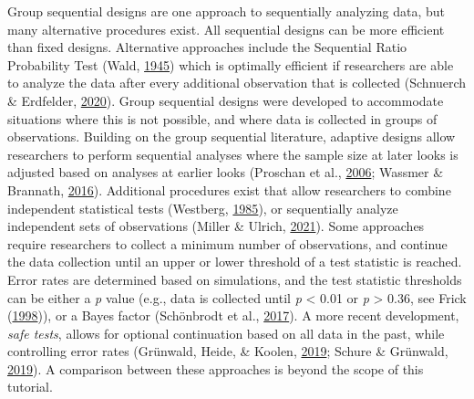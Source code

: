 \documentclass[
  english,
  ,jou, a4paper,floatsintext]{apa6}
\begin{document}
Group sequential designs are one approach to sequentially analyzing data, but many alternative procedures exist. All sequential designs can be more efficient than fixed designs. Alternative approaches include the Sequential Ratio Probability Test (Wald, \protect\hyperlink{ref-wald_sequential_1945}{1945}) which is optimally efficient if researchers are able to analyze the data after every additional observation that is collected (Schnuerch \& Erdfelder, \protect\hyperlink{ref-schnuerch_controlling_2020}{2020}). Group sequential designs were developed to accommodate situations where this is not possible, and where data is collected in groups of observations. Building on the group sequential literature, adaptive designs allow researchers to perform sequential analyses where the sample size at later looks is adjusted based on analyses at earlier looks (Proschan et al., \protect\hyperlink{ref-proschan_statistical_2006}{2006}; Wassmer \& Brannath, \protect\hyperlink{ref-wassmer_group_2016}{2016}). Additional procedures exist that allow researchers to combine independent statistical tests (Westberg, \protect\hyperlink{ref-westberg_combining_1985}{1985}), or sequentially analyze independent sets of observations (Miller \& Ulrich, \protect\hyperlink{ref-miller_simple_2021}{2021}). Some approaches require researchers to collect a minimum number of observations, and continue the data collection until an upper or lower threshold of a test statistic is reached. Error rates are determined based on simulations, and the test statistic thresholds can be either a \emph{p} value (e.g., data is collected until \emph{p} \textless{} 0.01 or \emph{p} \textgreater{} 0.36, see Frick (\protect\hyperlink{ref-frick_better_1998}{1998})), or a Bayes factor (Schönbrodt et al., \protect\hyperlink{ref-schonbrodt_sequential_2017}{2017}). A more recent development, \emph{safe tests}, allows for optional continuation based on all data in the past, while controlling error rates (Grünwald, Heide, \& Koolen, \protect\hyperlink{ref-grunwald_safe_2019}{2019}; Schure \& Grünwald, \protect\hyperlink{ref-ter_schure_accumulation_2019}{2019}). A comparison between these approaches is beyond the scope of this tutorial.
\end{document}

